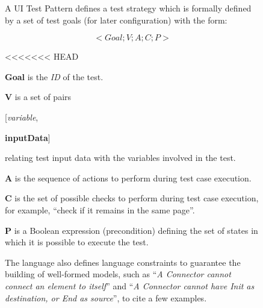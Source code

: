 \documentclass[conference]{IEEEtran}
\begin{document}
\begin{enumerate}
\begin{figure}[!htb]
A UI Test Pattern defines a test strategy which is formally defined by a set of test goals (for later configuration)\cite{moreira2013pattern} with the form:

\begin{equation}< Goal; V; A; C; P >\end{equation}\label{eq:ui_}

<<<<<<< HEAD
\begin{itemize}
\item[-] \textbf{Goal} is the \textit{ID} of the test. 
\item[-] \textbf{V} is a set of pairs { [\textit{variable}, 
\item[-] \textbf{inputData}] } relating test input data with the variables involved in the test. 
\item[-] \textbf{A} is the sequence of actions to perform during test case execution. 
\item[-] \textbf{C} is the set of possible checks to perform during test case execution, for example, “check if it remains in the same page”. 
\item[-] \textbf{P} is a Boolean expression (precondition) defining the set of states in which it is possible to execute the test. 
\end{itemize}

The language also defines language constraints to guarantee the building of well-formed models, such as ``\textit{A Connector cannot connect an element to itself}'' and ``\textit{A Connector cannot have Init as destination, or End as source}'', to cite a few examples.


\end{figure}
\end{enumerate}
\end{document}
